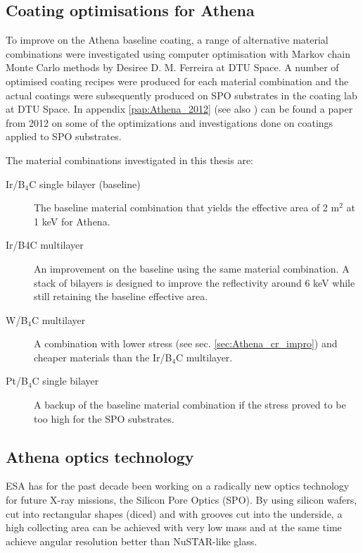 \subsection{Coating optimisations for Athena}
To improve on the Athena baseline coating, a range of alternative material combinations were investigated using computer optimisation with Markov chain Monte Carlo methods by Desiree D. M. Ferreira at DTU Space. A number of optimised coating recipes were produced for each material combination and the actual coatings were subsequently produced on SPO substrates in the coating lab at DTU Space. In appendix \ref{pap:Athena_2012} (see also \cite{ferreira2012Athena}) can be found a paper from 2012 on some of the optimizations and investigations done on coatings applied to SPO substrates.

The material combinations investigated in this thesis are:

\begin{description}
  \item[Ir/B$_4$C single bilayer (baseline)] The baseline material combination that yields the effective area of 2 m$^2$ at 1 keV for Athena.
  \item[Ir/B$4$C multilayer] An improvement on the baseline using the same material combination. A stack of bilayers is designed to improve the reflectivity around 6 keV while still retaining the baseline effective area.
  \item[W/B$_4$C multilayer] A combination with lower stress (see sec. \ref{sec:Athena_cr_impro}) and cheaper materials than the Ir/B$_4$C multilayer.
  \item[Pt/B$_4$C single bilayer] A backup of the baseline material combination if the stress proved to be too high for the SPO substrates.
\end{description}

\subsection{Athena optics technology}\label{sec:Athena_opt_tech}
ESA has for the past decade been working on a radically new optics technology for future X-ray missions, the Silicon Pore Optics (SPO)\cite{Barcons:2012va,Collon:2010bp,Collon:2006ky,Collon:2010bp,Collon:2006ky,Beijersbergen:2004cc}. By using silicon wafers, cut into rectangular shapes (diced) and with grooves cut into the underside, a high collecting area can be achieved with very low mass and at the same time achieve angular resolution better than NuSTAR-like glass.

